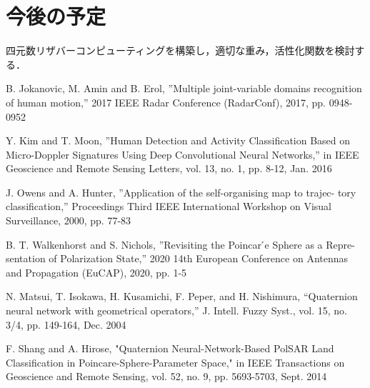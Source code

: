 \documentclass[uplatex,a4paper,10pt]{jsarticle}
\begin{document}
\section{今後の予定}
四元数リザバーコンピューティングを構築し，適切な重み，活性化関数を検討する．

\newpage
\begin{thebibliography}{99}
		
	 B. Jokanovic, M. Amin and B. Erol, ”Multiple joint-variable domains recognition of human motion,” 2017 IEEE Radar Conference (RadarConf), 2017, pp. 0948- 0952
	
     Y. Kim and T. Moon, ”Human Detection and Activity Classification Based on Micro-Doppler Signatures Using Deep Convolutional Neural Networks,” in IEEE Geoscience and Remote Sensing Letters, vol. 13, no. 1, pp. 8-12, Jan. 2016
	
     J. Owens and A. Hunter, ”Application of the self-organising map to trajec- tory classification,” Proceedings Third IEEE International Workshop on Visual Surveillance, 2000, pp. 77-83

     B. T. Walkenhorst and S. Nichols, ”Revisiting the Poincar ́e Sphere as a Repre- sentation of Polarization State,” 2020 14th European Conference on Antennas and Propagation (EuCAP), 2020, pp. 1-5
	
     N. Matsui, T. Isokawa, H. Kusamichi, F. Peper, and H. Nishimura,
    “Quaternion neural network with geometrical operators,” J. Intell. Fuzzy
    Syst., vol. 15, no. 3/4, pp. 149-164, Dec. 2004

     F. Shang and A. Hirose, "Quaternion Neural-Network-Based PolSAR Land Classification in Poincare-Sphere-Parameter Space," in IEEE Transactions on Geoscience and Remote Sensing, vol. 52, no. 9, pp. 5693-5703, Sept. 2014
	    

\end{thebibliography}
\end{document}
